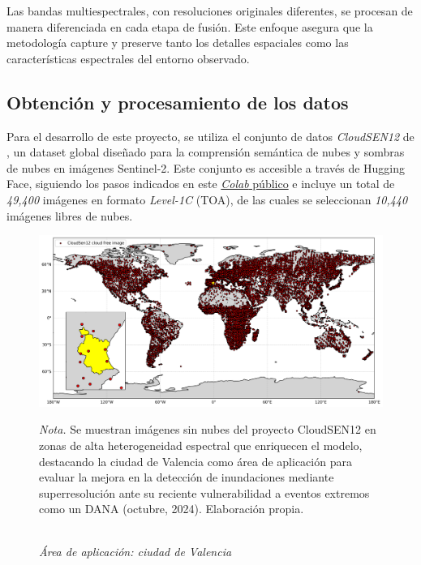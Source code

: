     Las bandas multiespectrales, con resoluciones originales diferentes, se procesan de manera diferenciada en cada etapa de fusión. Este enfoque asegura que la metodología capture y preserve tanto los detalles espaciales como las características espectrales del entorno observado.


    \subsection{Obtención y procesamiento de los datos}

        Para el desarrollo de este proyecto, se utiliza el conjunto de datos \textit{CloudSEN12} de \textcite{aybar2024cloudsen12+}, un dataset global diseñado para la comprensión semántica de nubes y sombras de nubes en imágenes Sentinel-2. Este conjunto es accesible a través de Hugging Face, siguiendo los pasos indicados en este \href{https://colab.research.google.com/drive/10QqUk-4pP6lZHj1I9GfMpzDY-cd0Fdza?usp=sharing}{\textit{Colab} público} e incluye un total de \textit{49,400} imágenes en formato \textit{Level-1C} (TOA), de las cuales se seleccionan \textit{10,440} imágenes libres de nubes.

        \begin{figure}[H] 
            \caption{\doublespacing \\ \textit{Área de aplicación: ciudad de Valencia}} 
            \centering
            \includegraphics[width=1\linewidth]{images/mapa_valencia.png}
            \begin{justify}
                \textit{Nota.} Se muestran imágenes sin nubes del proyecto CloudSEN12 en zonas de alta heterogeneidad espectral que enriquecen el modelo, destacando la ciudad de Valencia como área de aplicación para evaluar la mejora en la detección de inundaciones mediante superresolución ante su reciente vulnerabilidad a eventos extremos como un DANA (octubre, 2024). Elaboración propia.
            \end{justify}                    
            \label{fig:mapa_valencia}
        \end{figure}
        
